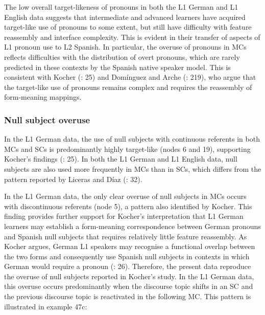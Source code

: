 \documentclass[
  letterpaper,
  DIV=11,
  numbers=noendperiod]{scrartcl}
\begin{document}
The low overall target-likeness of pronouns in both the L1 German and L1
English data suggests that intermediate and advanced learners have
acquired target-like use of pronouns to some extent, but still have
difficulty with feature reassembly and interface complexity. This is
evident in their transfer of aspects of L1 pronoun use to L2 Spanish. In
particular, the overuse of pronouns in MCs reflects difficulties with
the distribution of overt pronouns, which are rarely predicted in these
contexts by the Spanish native speaker model. This is consistent with
Kocher (: 25) and Domínguez and
Arche (: 219), who argue that
the target-like use of pronouns remains complex and requires the
reassembly of form-meaning mappings.

\subsubsection{Null subject overuse}\label{null-subject-overuse}

In the L1 German data, the use of null subjects with continuous
referents in both MCs and SCs is predominantly highly target-like (nodes
6 and 19), supporting Kocher's findings
(: 25). In both the L1
German and L1 English data, null subjects are also used more frequently
in MCs than in SCs, which differs from the pattern reported by Liceras
and Díaz (: 32).

In the L1 German data, the only clear overuse of null subjects in MCs
occurs with discontinuous referents (node 5), a pattern also identified
by Kocher. This finding provides further support for Kocher's
interpretation that L1 German learners may establish a form-meaning
correspondence between German pronouns and Spanish null subjects that
requires relatively little feature reassembly. As Kocher argues, German
L1 speakers may recognise a functional overlap between the two forms and
consequently use Spanish null subjects in contexts in which German would
require a pronoun (:
26). Therefore, the present data reproduce the overuse of null subjects
reported in Kocher's study. In the L1 German data, this overuse occurs
predominantly when the discourse topic shifts in an SC and the previous
discourse topic is reactivated in the following MC. This pattern is
illustrated in example 47c:
\end{document}

